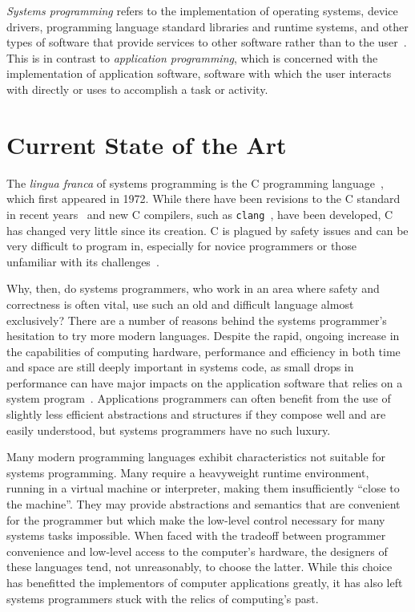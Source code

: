 \textit{Systems programming} refers to the implementation of operating systems, device drivers, programming language standard libraries and runtime systems, and other types of software that provide services to other software rather than to the user~\cite{Narten:2003:SP:1074100.1074850,Shapiro:2006:PLC:1215995.1216004}. This is in contrast to \textit{application programming}, which is concerned with the implementation of application software, software with which the user interacts with directly or uses to accomplish a task or activity.

\section{Current State of the Art}\label{sec:stateofart}

The \textit{lingua franca} of systems programming is the C programming language~\cite{kernighan1988c}, which first appeared in 1972. While there have been revisions to the C standard in recent years~\cite{C11,C99} and new C compilers, such as \texttt{clang}~\cite{lattner2008llvm}, have been developed, C has changed very little since its creation. C is plagued by safety issues and can be very difficult to program in, especially for novice programmers or those unfamiliar with its challenges~\cite{Shapiro:2006:PLC:1215995.1216004,Ray:2014:LSS:2635868.2635922,Bhattacharya:2011:APL:1985793.1985817}.

Why, then, do systems programmers, who work in an area where safety and correctness is often vital, use such an old and difficult language almost exclusively? There are a number of reasons behind the systems programmer's hesitation to try more modern languages. Despite the rapid, ongoing increase in the capabilities of computing hardware, performance and efficiency in both time and space are still deeply important in systems code, as small drops in performance can have major impacts on the application software that relies on a system program~\cite{Shapiro:2006:PLC:1215995.1216004}. Applications programmers can often benefit from the use of slightly less efficient abstractions and structures if they compose well and are easily understood, but systems programmers have no such luxury.

Many modern programming languages exhibit characteristics not suitable for systems programming. Many require a heavyweight runtime environment, running in a virtual machine or interpreter, making them insufficiently ``close to the machine''. They may provide abstractions and semantics that are convenient for the programmer but which make the low-level control necessary for many systems tasks impossible. When faced with the tradeoff between programmer convenience and low-level access to the computer's hardware, the designers of these languages tend, not unreasonably, to choose the latter. While this choice has benefitted the implementors of computer applications greatly, it has also left systems programmers stuck with the relics of computing's past.

